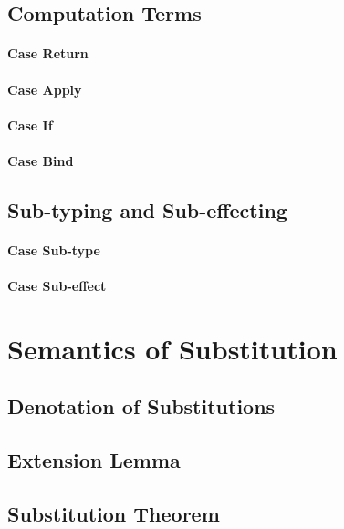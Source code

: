 {    \subsection{Computation Terms}
    \paragraph{Case Return}
      
    \paragraph{Case Apply}
        
    \paragraph{Case If}
       
    \paragraph{Case Bind}
        
    \subsection{Sub-typing and Sub-effecting}
    \paragraph{Case Sub-type}
        
    \paragraph{Case Sub-effect}
    
    \section{Semantics of Substitution}
    \subsection{Denotation of Substitutions}
    
    \subsection{Extension Lemma}
   
    \subsection{Substitution Theorem}

}
